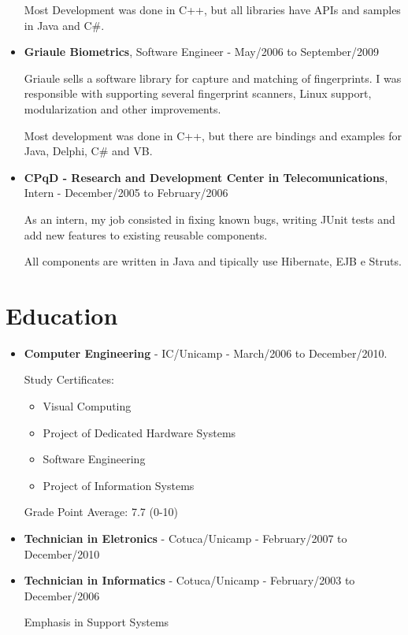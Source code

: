 \documentclass[a4paper,10pt]{article}
\begin{document}
\begin{itemize}
        Most Development was done in C++, but all libraries have APIs and samples in Java and C\#.

      \item  
        \textbf{Griaule Biometrics}, Software Engineer - May/2006 to September/2009

        Griaule sells a software library for capture and matching of fingerprints. I was responsible with supporting several fingerprint scanners, Linux support, modularization and other improvements.
        
        Most development was done in C++, but there are bindings and examples for Java, Delphi, C\# and VB.

      \item
        \textbf{CPqD - Research and Development Center in Telecomunications}, Intern - December/2005 to February/2006

        As an intern, my job consisted in fixing known bugs, writing JUnit tests and add new features to existing reusable components.

        All components are written in Java and tipically use Hibernate, EJB e Struts.
    \end{itemize}
    
  \section{Education}
    \begin{itemize}
      \item  
        \textbf{Computer Engineering} - IC/Unicamp - March/2006 to December/2010.

        Study Certificates:
        \begin{itemize}
          \item Visual Computing
          \item Project of Dedicated Hardware Systems
          \item Software Engineering
          \item Project of Information Systems
        \end{itemize}

        Grade Point Average: 7.7  (0-10)


      \item  
        \textbf{Technician in Eletronics} - Cotuca/Unicamp - February/2007 to December/2010


      \item  
        \textbf{Technician in Informatics} - Cotuca/Unicamp - February/2003 to December/2006

        Emphasis in Support Systems


    \end{itemize}
    
\end{document}
